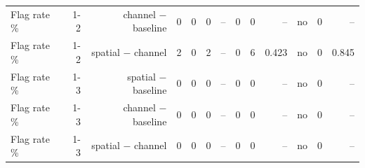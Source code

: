 \begin{table}[t]
\begin{tabular}{lrrrrrrrrrrrr}
Flag rate \% & 1-2 & channel $-$ baseline & 0 & 0 & 0 & – & 0 & 0 & – & no & 0 & – \\
Flag rate \% & 1-2 & spatial $-$ channel & 2 & 0 & 2 & – & 0 & 6 & 0.423 & no & 0 & 0.845 \\
Flag rate \% & 1-3 & spatial $-$ baseline & 0 & 0 & 0 & – & 0 & 0 & – & no & 0 & – \\
Flag rate \% & 1-3 & channel $-$ baseline & 0 & 0 & 0 & – & 0 & 0 & – & no & 0 & – \\
Flag rate \% & 1-3 & spatial $-$ channel & 0 & 0 & 0 & – & 0 & 0 & – & no & 0 & – \\
\bottomrule
\end{tabular}
\end{table}
